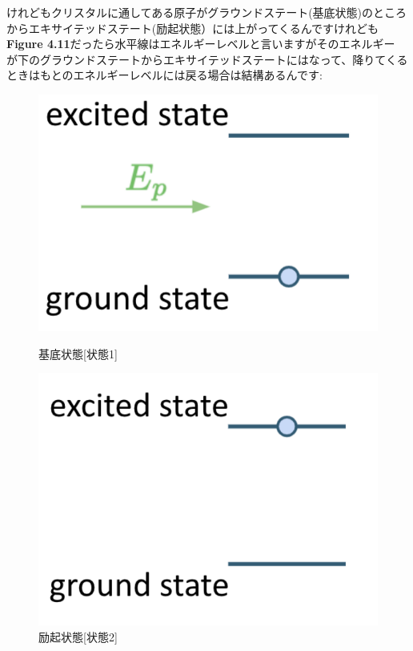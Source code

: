 けれどもクリスタルに通してある原子がグラウンドステート(基底状態)のところからエキサイテッドステート(励起状態）には上がってくるんですけれども\textbf{Figure 4.11}だったら水平線はエネルギーレベルと言いますがそのエネルギー
が下のグラウンドステートからエキサイテッドステートにはなって、降りてくるときはもとのエネルギーレベルには戻る場合は結構あるんです:
\begin{figure}[H]
  \centering
  \begin{minipage}[b]{0.3\textwidth}
    \includegraphics[width=\textwidth]{lesson4/state1.pdf}
    \caption{基底状態[状態1]}
  \end{minipage}
  \hfill
  \begin{minipage}[b]{0.3\textwidth}
    \includegraphics[width=\textwidth]{lesson4/state2.pdf}
    \caption{励起状態[状態2]}

\end{minipage}
\end{figure}
